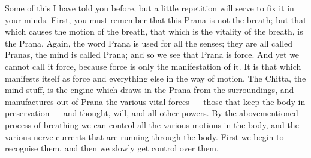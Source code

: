 Some of this I have told you before, but a little repetition
will serve to fix it in your minds. First, you must remember that this
Prana is not the breath; but that which causes the motion of the
breath, that which is the vitality of the breath, is the Prana. Again,
the word Prana is used for all the senses; they are all called Pranas,
the mind is called Prana; and so we see that Prana is force. And yet we
cannot call it force, because force is only the manifestation of it. It
is that which manifests itself as force and everything else in the way
of motion. The Chitta, the mind-stuff, is the engine which draws in the
Prana from the surroundings, and manufactures out of Prana the various
vital forces — those that keep the body in preservation — and thought,
will, and all other powers. By the abovementioned process of breathing
we can control all the various motions in the body, and the various
nerve currents that are running through the body. First we begin to
recognise them, and then we slowly get control over them. \\

